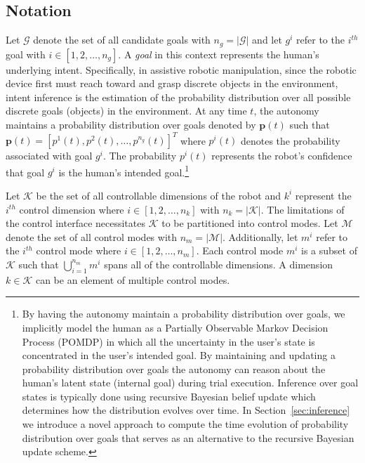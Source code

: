 \documentclass[journal]{IEEEtran}
\begin{document}
\subsection{Notation}
Let $\mathcal{G}$ denote the set of all candidate goals with $n_g = |\mathcal{G}|$ and let $g^i$ refer to the $i^{th}$ goal with $i \in [1,2,\dots,n_g]$. A \textit{goal} in this context represents the human's underlying intent. Specifically, in assistive robotic manipulation, since the robotic device first must reach toward and grasp discrete objects in the environment, intent inference is the estimation of the probability distribution over all possible discrete goals (objects) in the environment. At any time $t$, the autonomy maintains a probability distribution over goals denoted by $\boldsymbol{p}(t)$ such that $\boldsymbol{p}(t) = [p^1(t), p^2(t),\dots, p^{n_g}(t)]^{T}$ where $p^i(t)$ denotes the probability associated with goal $g^i$. The probability $p^i(t)$ represents the robot's confidence that goal $g^i$ is the human's intended goal.\footnote{By having the autonomy maintain a probability distribution over goals, we implicitly model the human as a Partially Observable Markov Decision Process (POMDP) in which all the uncertainty in the user's state is concentrated in the user's intended goal. By maintaining and updating a probability distribution over goals the autonomy can reason about the human's latent state (internal goal) during trial execution.  Inference over goal states is typically done using recursive Bayesian belief update which determines how the distribution evolves over time. In Section~\ref{sec:inference} we introduce a novel approach to compute the time evolution of probability distribution over goals that serves as an alternative to the recursive Bayesian update scheme.} 


Let $\mathcal{K}$ be the set of all controllable dimensions of the robot and $k^i$ represent the $i^{th}$ control dimension where $i \in [1,2,\dots,n_k]$ with $n_k = |\mathcal{K}|$. The limitations of the control interface necessitates $\mathcal{K}$ to be partitioned into control modes. Let $\mathcal{M}$ denote the set of all control modes with $n_m = \vert\mathcal{M}\vert$. Additionally, let $m^i$ refer to the $i^{th}$ control mode where $i \in [1,2,\dots,n_m]$. Each control mode $m^i$ is a subset of $\mathcal{K}$ such that $\bigcup\limits_{i=1}^{n_m} m^i$ spans all of the controllable dimensions. A dimension $k \in \mathcal{K}$ can be an element of multiple control modes.

\end{document}
